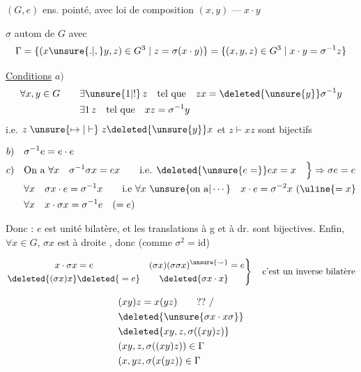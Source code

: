 $(G,e)$ ens. pointé, avec loi de composition $(x,y)\mathrel{\text{---}}x\cdot y$

$\sigma$ autom de $G$  avec \quad {}
\[
\Gamma=\{(x\unsure{.|,}y,z)\in G^3\mid z=\sigma(x\cdot y)\}
=\{(x,y,z)\in G^3\mid x\cdot y=\sigma^{-1}z\}
\]

\uline{Conditions} \quad $a)$
\[
\begin{aligned}
\forall x,y\in G\qquad &\exists\unsure{1|!}\,z\quad\text{tel que}\quad zx=\deleted{\unsure{y}}\sigma^{-1}y\\
&\exists1\,z\quad\text{tel que}\quad xz=\sigma^{-1}y
\end{aligned}
\]
i.e. $z\mathrel{\unsure{\mapsto|\vdash}}z\deleted{\unsure{y}}x$ et $z\mathrel{\vdash}xz$ sont bijectifs

\[
\begin{aligned}
b)&\quad \sigma^{-1}e=e\cdot e\\
c)&\quad\text{On a }\forall x\quad \sigma^{-1}\sigma x=ex\qquad\text{i.e. }\deleted{\unsure{e=}}ex=x
\quad\Big\}\Rightarrow\sigma e=e\\
&\quad\forall x\quad\sigma x\cdot e=\sigma^{-1}x\qquad\text{i.e }\forall x\ \unsure{\text{on a}|\cdots}\quad x\cdot e=\sigma^{-2}x\ (\uline{=x}\\
&\quad\forall x\quad x\cdot\sigma x=\sigma^{-1}e\quad(=e)
\end{aligned}
\]



Donc : $e$ est unité bilatère,  et les translations à g et à dr. sont bijectives. Enfin, $\forall x\in G$, $\sigma x$ est  à droite , donc (comme $\sigma^2=\mathrm{id}$)

\[
\left.\begin{aligned}
x\cdot\sigma x&=e&(\sigma x)(\sigma\sigma x)^{\unsure{\smile}}&=e\\
\deleted{(\sigma x)x}&\deleted{{}=e}&\deleted{\sigma x\cdot x}&
\end{aligned}\right\}\quad\text{c'est un inverse bilatère}
\]

\[
\begin{aligned}
&(xy)z=x(yz)\qquad ??\ /\\
&\deleted{\unsure{\sigma x\cdot x\sigma}}\\
&\deleted{xy,z,\sigma((xy)z)}\\
&(xy,z,\sigma((xy)z))\in\Gamma\\
&(x,yz,\sigma(x(yz))\in\Gamma
\end{aligned}
\]

